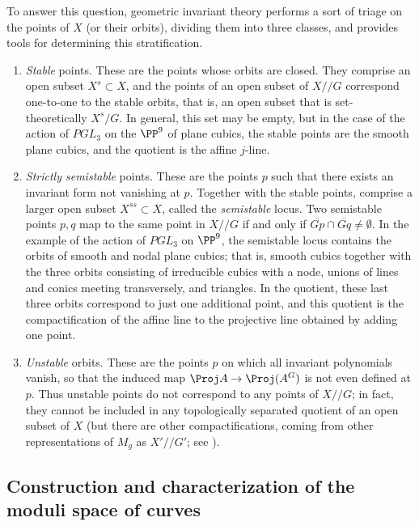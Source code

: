 To answer this question, geometric invariant theory performs a sort of triage on the points of $X$ (or their orbits), dividing them into three classes,
and provides tools for determining this stratification. 
\begin{enumerate}


\item  \emph{Stable} points. These are the points whose orbits are closed. They comprise an open subset $X^s \subset X$, and the points of an open subset of $X//G$ correspond one-to-one to the stable orbits, that is, an open subset that is set-theoretically $X^s/G$. In general, this set may be empty, but in the case of the action of $PGL_3$ on the $\PP^9$ of plane cubics, the stable points are the smooth plane cubics, and the quotient is the affine $j$-line.

\item \emph{Strictly semistable} points. These are the points $p$ such that there exists an invariant form not vanishing at $p$.  Together with the stable points, comprise a larger open subset $X^{ss} \subset X$, called the \emph{semistable} locus. Two  semistable points $p,q$ map to the same point in $X//G$ if and only if $\overline{Gp}\cap \overline{Gq} \neq \emptyset$. In the example of the action of $PGL_3$ on  $\PP^9$, the semistable  locus contains  the orbits of smooth and nodal plane cubics; that is, smooth cubics together with the three orbits consisting of irreducible cubics with a node, unions of lines and conics meeting transversely, and triangles. In the quotient, these last three orbits correspond to just one additional point, and this quotient is the compactification of the affine line to the projective line obtained by adding one point.

\item  \emph{Unstable} orbits. These are the points $p$ on which all invariant polynomials vanish, so that the induced map
$\Proj A \to \Proj (A^G)$ is not even defined at $p$. Thus unstable points do not correspond to any points of $X//G$; in fact, they cannot be included in any topologically separated quotient of an open subset of $X$ (but there are other compactifications, coming from
other representations of $M_g$ as $X'//G'$; see \cite{MR3044128}).
\end{enumerate}

\subsection{Construction and characterization of the moduli space of curves}

